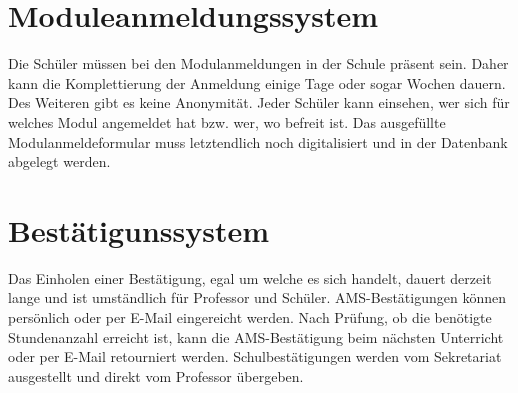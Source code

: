 \section{Moduleanmeldungssystem}

Die Schüler müssen bei den Modulanmeldungen in der Schule präsent sein. 
Daher kann die Komplettierung der Anmeldung einige Tage oder sogar Wochen dauern. 
Des Weiteren gibt es keine Anonymität. Jeder Schüler kann einsehen, wer sich für welches Modul angemeldet hat bzw. wer, wo befreit ist. 
Das ausgefüllte Modulanmeldeformular muss letztendlich noch digitalisiert und in der Datenbank abgelegt werden.


\section{Bestätigunssystem}

Das Einholen einer Bestätigung, egal um welche es sich handelt, dauert derzeit lange und ist umständlich für Professor und Schüler. 
AMS-Bestätigungen können persönlich oder per E-Mail eingereicht werden. 
Nach Prüfung, ob die benötigte Stundenanzahl erreicht ist, kann die AMS-Bestätigung beim nächsten Unterricht oder per E-Mail retourniert werden. 
Schulbestätigungen werden vom Sekretariat ausgestellt und direkt vom Professor übergeben. 